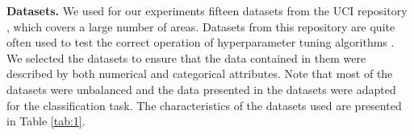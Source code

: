 \documentclass[preprint,12pt]{elsarticle}
\begin{document}
\textbf{Datasets.} 
We used for our experiments fifteen datasets from the UCI repository \cite{UCI}, which covers a large number of areas. Datasets from this repository are quite often used to test the correct operation of hyperparameter tuning algorithms \cite{Joy2020,Wang2021,Wu2023}. We selected the datasets to ensure that the data contained in them were described by both numerical and categorical attributes. Note that most of the datasets were unbalanced and the data presented in the datasets were adapted for the classification task.  The characteristics of the datasets used are presented in Table \ref{tab:1}.


\begin{table}[ht]
\caption{The datasets used in the experiments}
\label{tab:1}
\end{table}
\end{document}
